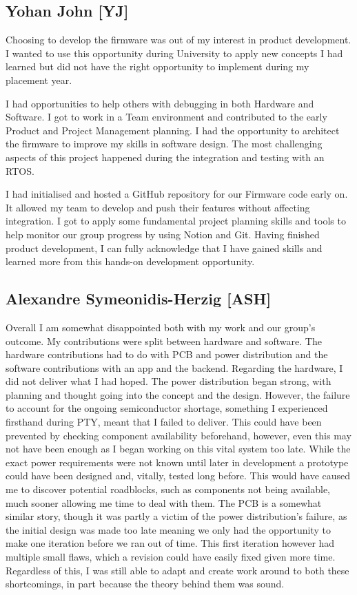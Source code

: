 \subsection{Yohan John [YJ]}
Choosing to develop the firmware was out of my interest in product development.
I wanted to use this opportunity during University to apply new concepts I had learned but did not have the right opportunity to implement during my placement year.

I had opportunities to help others with debugging in both Hardware and Software.
I got to work in a Team environment and contributed to the early Product and Project Management planning.
I had the opportunity to architect the firmware to improve my skills in software design.
The most challenging aspects of this project happened during the integration and testing with an RTOS.

I had initialised and hosted a GitHub repository for our Firmware code early on.
It allowed my team to develop and push their features without affecting integration.
I got to apply some fundamental project planning skills and tools to help monitor our group progress by using Notion and Git.
Having finished product development, I can fully acknowledge that I have gained skills and learned more from this hands-on development opportunity.


\subsection{Alexandre Symeonidis-Herzig [ASH]}
Overall I am somewhat disappointed both with my work and our group's outcome.
My contributions were split between hardware and software. 
The hardware contributions had to do with PCB and power distribution and the software contributions with an app and the backend.
Regarding the hardware, I did not deliver what I had hoped.
The power distribution began strong, with planning and thought going into the concept and the design.
However, the failure to account for the ongoing semiconductor shortage, something I experienced firsthand during PTY, meant that I failed to deliver.
This could have been prevented by checking component availability beforehand, however, even this may not have been enough as I began working on this vital system too late.
While the exact power requirements were not known until later in development a prototype could have been designed and, vitally, tested long before.
This would have caused me to discover potential roadblocks, such as components not being available, much sooner allowing me time to deal with them.
The PCB is a somewhat similar story, though it was partly a victim of the power distribution's failure,
as the initial design was made too late meaning we only had the opportunity to make one iteration before we ran out of time.
This first iteration however had multiple small flaws, which a revision could have easily fixed given more time.
Regardless of this, I was still able to adapt and create work around to both these shortcomings, in part because the theory behind them was sound.

